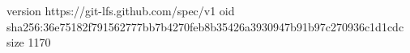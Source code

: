 version https://git-lfs.github.com/spec/v1
oid sha256:36e75182f791562777bb7b4270feb8b35426a3930947b91b97c270936c1d1cdc
size 1170
